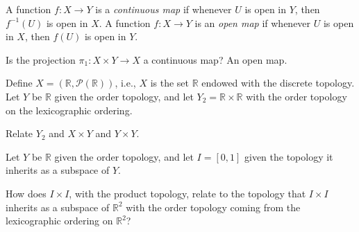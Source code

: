 \documentclass[12pt]{pset}
\newcommand{\RR}{\mathbb{R}}
\begin{document}
\pagebreak

\begin{problem}

  A function $f : X \to Y$ is a \textit{continuous map} if whenever
  $U$ is open in $Y$, then $f^{-1}(U)$ is open in $X$.  A function
  $f : X \to Y$ is an \textit{open map} if whenever $U$ is open in
  $X$, then $f(U)$ is open in $Y$.

  Is the projection $\pi_1 : X \times Y \to X$ a continuous map?  An
  open map.

\end{problem}

\begin{problem}

  Define $X = (\RR,\mathcal{P}(\RR))$, i.e., $X$ is the set $\RR$
  endowed with the discrete topology.  Let $Y$ be $\RR$ given the
  order topology, and let $Y_2 = \RR \times \RR$ with the order
  topology on the lexicographic ordering.

  Relate $Y_2$ and $X \times Y$ and $Y \times Y$.

\end{problem}

\begin{problem}


  Let $Y$ be $\RR$ given the order topology, and let $I = [0,1]$ given
  the topology it inherits as a subspace of $Y$.

  How does $I \times I$, with the product topology, relate to the
  topology that $I \times I$ inherits as a subspace of $\RR^2$ with
  the order topology coming from the lexicographic ordering on
  $\RR^2$?

\end{problem}
\end{document}
